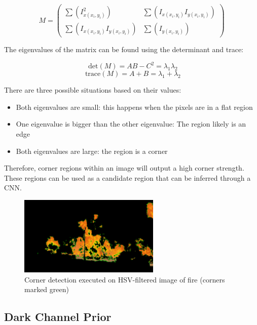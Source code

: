 \[M = \begin{pmatrix}
\sum(I_{x\left( x_{i},y_{i} \right)}^{2}) & \sum(I_{x\left( x_{i},y_{i} \right)}I_{y\left( x_{i},y_{i} \right)}) \\
\sum(I_{x\left( x_{i},y_{i} \right)}I_{y\left( x_{i},y_{i} \right)}) & \sum(I_{y\left( x_{i},y_{i} \right)})
\end{pmatrix}\]

The eigenvalues of the matrix can be found using the determinant and
trace:

\[\text{ det}(M) = AB - C^{2} = \lambda_{1}\lambda_{2}\]
\[\text{ trace}(M) = A + B = \lambda_{1} + \lambda_{2}\]

There are three possible situations based on their values:

\begin{itemize}
\item
  Both eigenvalues are small: this happens when the pixels are in a flat
  region
\item
  One eigenvalue is bigger than the other eigenvalue: The region likely
  is an edge
\item
  Both eigenvalues are large: the region is a corner
\end{itemize}

Therefore, corner regions within an image will output a high corner
strength. These regions can be used as a candidate region that can be
inferred through a CNN.

\begin{figure}
\centering
\includegraphics[width=0.6\textwidth,height=\textheight]{corner.png}
\caption{Corner detection executed on HSV-filtered image of fire
(corners marked green)}
\end{figure}

\label{firecorner}{}

\subsection{Dark Channel Prior}

